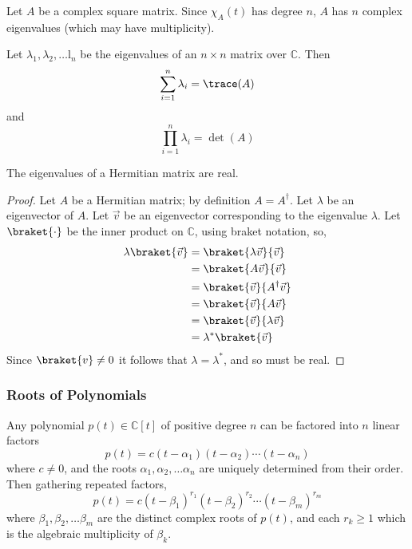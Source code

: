 \begin{theorem}
  Let $A$ be a complex square matrix. Since $\chi_A(t)$ has degree
  $n$, $A$ has $n$ complex eigenvalues (which may have multiplicity).
\end{theorem}

\begin{lemma}
  Let $\lambda_1, \lambda_2, \dots $l$_n$ be the eigenvalues of an $n
  \times n$ matrix over $\mathbb{C}$. Then
  \[ \sum_{i=1}^n \lambda_i = \trace(A) \] and \[ \prod_{i=1}^n
  \lambda_i = \det(A) \]
\end{lemma}

\begin{theorem}
  \label{the:eigenvaluehermitian}
  The eigenvalues of a Hermitian matrix are real.

  \begin{proof}
    Let $A$ be a Hermitian matrix; by definition $A = A^\dagger$.  Let
    $\lambda$ be an eigenvector of $A$.  Let $\vec{v}$ be an
    eigenvector corresponding to the eigenvalue $\lambda$.  Let
    $\braket{\cdot}$ be the inner product on $\mathbb{C}$, using
    braket notation, so,
    \begin{align*}
      \lambda \braket{\vec{v}} &= \braket{\lambda \vec{v}}{\vec{v}} \\
      &= \braket{A \vec{v}}{\vec{v}} \\
      &= \braket{\vec{v}}{A^{\dagger}\vec{v}} \\
      &= \braket{\vec{v}}{A\vec{v}}\\
      &= \braket{\vec{v}}{\lambda \vec{v}} \\
      &= \lambda^{*} \braket{\vec{v}}
    \end{align*}
    Since $\braket{v} \neq 0$ it follows that $\lambda = \lambda^{*}$,
    and so must be real.
  \end{proof}
\end{theorem}

\subsubsection{Roots of Polynomials}
\label{sec:polynomialroots}

Any polynomial $p(t) \in \mathbb{C}[t]$ of positive degree $n$ can be
factored into $n$ linear factors
\[ p(t) = c(t-\alpha_1)(t-\alpha_2)\cdots (t-\alpha_n) \] where $c
\neq 0$, and the roots $\alpha_1, \alpha_2, \dots \alpha_n$ are
uniquely determined from their order. Then gathering repeated factors,
\[ p(t) = c(t-\beta_1)^{r_1} (t-\beta_2)^{r_2} \cdots
(t-\beta_m)^{r_m} \] where $\beta_1, \beta_2, \dots \beta_m$ are the
distinct complex roots of $p(t)$, and each $r_k \ge 1$ which is the
algebraic multiplicity of $\beta_k$.

